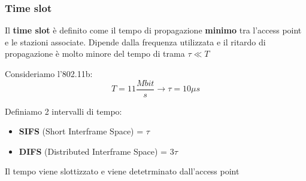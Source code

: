 \documentclass[a4paper]{article}
\begin{document}
\subsubsection{Time slot}
Il \textbf{time slot} è definito come il tempo di propagazione \textbf{minimo} tra
l'access point e le stazioni associate. Dipende dalla frequenza utilizzata e
il ritardo di propagazione è molto minore del tempo di trama \( \tau \ll T \) 
\begin{example}
  Consideriamo l'802.11b:
  \[
  T = 11 \frac{Mbit}{s} \to \tau = 10 \mu s
  \] 
\end{example}
Definiamo 2 intervalli di tempo:
\begin{itemize}
  \item \textbf{SIFS} (Short Interframe Space) = \( \tau \) 
  \item \textbf{DIFS} (Distributed Interframe Space) = \( 3\tau \)
\end{itemize}
Il tempo viene slottizzato e viene detetrminato dall'access point
\end{document}
